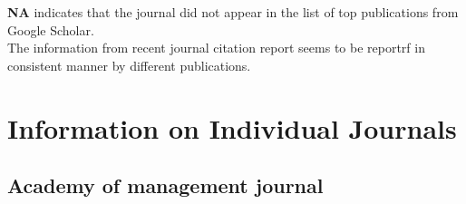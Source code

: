 {\bf NA} indicates that the journal did not appear in the list of top publications from Google Scholar.\\

The information from recent journal citation report seems to be reportrf in consistent manner by different publications. \\



\section{Information on Individual Journals}

\subsection{Academy of management journal}


